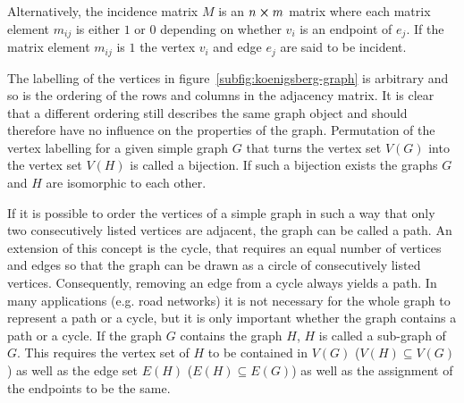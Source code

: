 Alternatively, the incidence matrix $M$ is an $n \cross m$ matrix where each
matrix element $m_{ij}$ is either $1$ or $0$ depending on whether $v_i$ is an
endpoint of $e_j$. If the matrix element $m_{ij}$ is $1$ the vertex $v_i$ and
edge $e_j$ are said to be incident.

The labelling of the vertices in figure~\ref{subfig:koenigsberg-graph} is
arbitrary and so is the ordering of the rows and columns in the adjacency
matrix. It is clear that a different ordering still describes the same graph
object and should therefore have no influence on the properties of the graph.
Permutation of the vertex labelling for a given simple graph $G$ that turns the
vertex set $V(G)$ into the vertex set $V(H)$ is called a bijection. If such a
bijection exists the graphs $G$ and $H$ are isomorphic to each other.

If it is possible to order the vertices of a simple graph in such a way that
only two consecutively listed vertices are adjacent, the graph can be called a
path. An extension of this concept is the cycle, that requires an equal number
of vertices and edges so that the graph can be drawn as a circle of
consecutively listed vertices. Consequently, removing an edge from a cycle
always yields a path. In many applications (e.g. road networks) it is not
necessary for the whole graph to represent a path or a cycle, but it is only
important whether the graph contains a path or a cycle. If the graph $G$
contains the graph $H$, $H$ is called a sub-graph of $G$. This requires the
vertex set of $H$ to be contained in $V(G)$ ($V(H)\subseteq V(G)$) as well as
the edge set $E(H)$ ($E(H)\subseteq E(G)$) as well as the assignment of the
endpoints to be the same.

